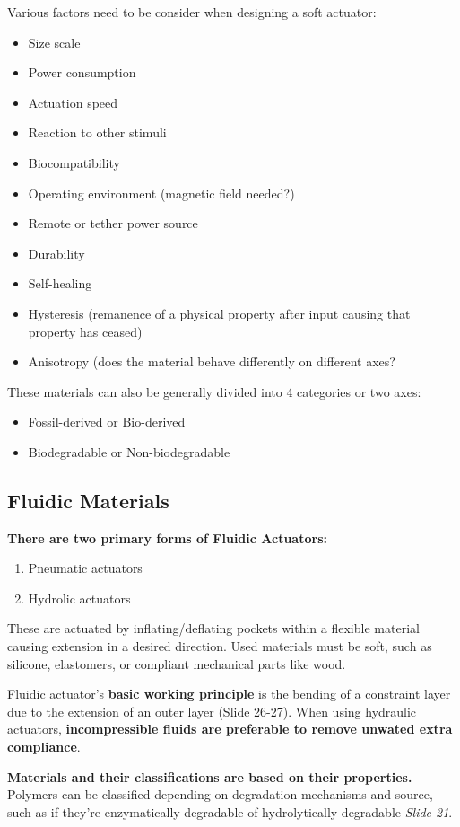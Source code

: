 \documentclass[onecolumn,a4paper]{article}
\begin{document}
Various factors need to be consider when designing a soft actuator:
\begin{itemize}
    \item Size scale
    \item Power consumption
    \item Actuation speed
    \item Reaction to other stimuli
    \item Biocompatibility
    \item Operating environment (magnetic field needed?)
    \item Remote or tether power source
    \item Durability
    \item Self-healing
    \item Hysteresis (remanence of a physical property after input causing that property has ceased)
    \item Anisotropy (does the material behave differently on different axes?
\end{itemize}
These materials can also be generally divided into 4 categories or two axes:
\begin{itemize}
    \item Fossil-derived or Bio-derived
    \item Biodegradable or Non-biodegradable
\end{itemize}

\subsection{Fluidic Materials}
\textbf{There are two primary forms of Fluidic Actuators:}
\begin{enumerate}
    \item Pneumatic actuators
    \item Hydrolic actuators
\end{enumerate}

These are actuated by inflating/deflating pockets within a flexible material causing extension in a desired direction. Used materials must be soft, such as silicone, elastomers, or compliant mechanical parts like wood.

Fluidic actuator's \textbf{basic working principle} is the bending of a constraint layer due to the extension of an outer layer (Slide 26-27). When using hydraulic actuators, \textbf{incompressible fluids are preferable to remove unwated extra compliance}.

\textbf{Materials and their classifications are based on their properties.} Polymers can be classified depending on degradation mechanisms and source, such as if they're enzymatically degradable of hydrolytically degradable \emph{Slide 21}.
\end{document}
